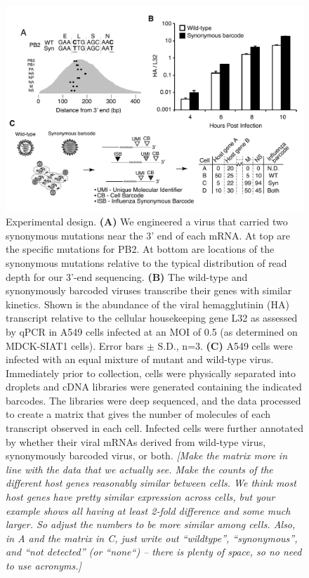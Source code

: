 \documentclass[9pt,lineno]{elife}
\newcommand{\jdbcomment}[1]{\emph{\color{red} [#1]}}
\begin{document}
\begin{figure}
\centerline{\includegraphics[width=0.8\linewidth]{figures/Workflow/workflow.pdf}}
\caption{\label{fig:workflow} Experimental design.
{\bf (A)}  
We engineered a virus that carried two synonymous mutations near the 3' end of each mRNA.
At top are the specific mutations for PB2.
At bottom are locations of the synonymous mutations relative to the typical distribution of read depth for our 3'-end sequencing.
{\bf (B)} 
The wild-type and synonymously barcoded viruses transcribe their genes with similar kinetics. 
Shown is the abundance of the viral hemagglutinin (HA) transcript relative to the cellular housekeeping gene L32 as assessed by qPCR in A549 cells infected at an MOI of 0.5 (as determined on MDCK-SIAT1 cells).
Error bars $\pm$ S.D., n=3.
{\bf (C)}  
A549 cells were infected with an equal mixture of mutant and wild-type virus. 
Immediately prior to collection, cells were physically separated into droplets and cDNA libraries were generated containing the indicated barcodes. 
The libraries were deep sequenced, and the data processed to create a matrix that gives the number of molecules of each transcript observed in each cell.
Infected cells were further annotated by whether their viral mRNAs derived from wild-type virus, synonymously barcoded virus, or both.
\jdbcomment{Make the matrix more in line with the data that we actually see. Make the counts of the different host genes reasonably similar between cells. We think most host genes have pretty similar expression across cells, but your example shows all having at least 2-fold difference and some much larger. So adjust the numbers to be more similar among cells. Also, in A and the matrix in C, just write out ``wildtype'', ``synonymous'', and ``not detected'' (or ``none``) -- there is plenty of space, so no need to use acronyms.}
}
\end{figure}
\end{document}
